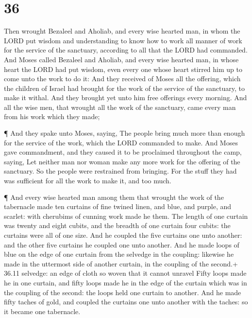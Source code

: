 \hypertarget{section-35}{%
\section{36}\label{section-35}}

 Then wrought Bezaleel and Aholiab, and every wise hearted
man, in whom the LORD put wisdom and understanding to know how to work
all manner of work for the service of the sanctuary, according to all
that the LORD had commanded.  And Moses called Bezaleel and
Aholiab, and every wise hearted man, in whose heart the LORD had put
wisdom, even every one whose heart stirred him up to come unto the work
to do it:  And they received of Moses all the offering,
which the children of Israel had brought for the work of the service of
the sanctuary, to make it withal. And they brought yet unto him free
offerings every morning.  And all the wise men, that wrought
all the work of the sanctuary, came every man from his work which they
made;

 ¶ And they spake unto Moses, saying, The people bring much
more than enough for the service of the work, which the LORD commanded
to make.  And Moses gave commandment, and they caused it to
be proclaimed throughout the camp, saying, Let neither man nor woman
make any more work for the offering of the sanctuary. So the people were
restrained from bringing.  For the stuff they had was
sufficient for all the work to make it, and too much.

 ¶ And every wise hearted man among them that wrought the
work of the tabernacle made ten curtains of fine twined linen, and blue,
and purple, and scarlet: with cherubims of cunning work made he them.
 The length of one curtain was twenty and eight cubits, and
the breadth of one curtain four cubits: the curtains were all of one
size.  And he coupled the five curtains one unto another:
and the other five curtains he coupled one unto another. 
And he made loops of blue on the edge of one curtain from the selvedge
in the coupling: likewise he made in the uttermost side of another
curtain, in the coupling of the second.+ 36.11 selvedge: an edge of
cloth so woven that it cannot unravel  Fifty loops made he
in one curtain, and fifty loops made he in the edge of the curtain which
was in the coupling of the second: the loops held one curtain to
another.  And he made fifty taches of gold, and coupled the
curtains one unto another with the taches: so it became one tabernacle.

